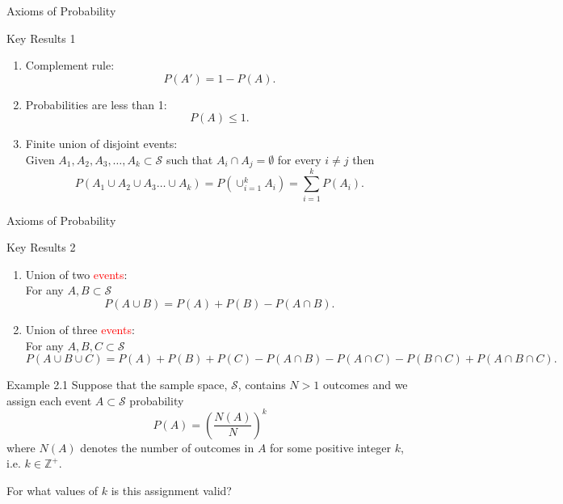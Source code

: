 \documentclass[aspectratio=169,xcolor=pdftex,dvipsnames,table]{beamer}\usepackage[]{graphicx}\usepackage[]{xcolor}
\begin{document}
\begin{frame}{Axioms of Probability}
  \begin{block}{Key Results 1}
    \begin{enumerate}
    \item Complement rule:
      \[
        P(A')=1-P(A).
      \]
    \item Probabilities are less than 1:
      \[P(A) \leq 1.\]
    \item Finite union of disjoint events:\\
      Given $A_1,A_2,A_3,\ldots,A_k \subset \mathcal{S}$ such that $A_i\cap A_j=\emptyset$ for every $i\neq j$ then
      \[
        P(A_1 \cup A_2 \cup A_3\ldots\cup A_k)=P(\cup_{i=1}^k A_i)=\sum_{i=1}^k P(A_i).
      \]
    \end{enumerate}
  \end{block}

\end{frame}

\begin{frame}{Axioms of Probability}
  \begin{block}{Key Results 2}
    \begin{enumerate}
     \item Union of two \textcolor{red}{events}:\\
      For any $A,B \subset \mathcal S$
      \[
        P(A \cup B)=P(A) + P(B) - P(A\cap B).
      \]
    \item Union of three \textcolor{red}{events}:\\
      For any $A,B,C \subset \mathcal S$
      \[
        P(A \cup B\cup C)=P(A) + P(B) +P(C) - P(A\cap B) -P(A\cap C) -P(B \cap C) + P(A \cap B \cap C).
      \]
      
    \end{enumerate}
  \end{block}

\end{frame}

\begin{frame}{Example 2.1}
  Suppose that the sample space, $\mathcal S$, contains $N>1$ outcomes and we assign each event $A \subset \mathcal S$ probability
  \[
    P(A)=\left(\frac{N(A)}{N}\right)^k
  \]
  where $N(A)$ denotes the number of outcomes in $A$ for some positive integer $k$, i.e. $k \in \mathbb{Z}^+$.

  \medskip

  \begin{center}
    For what values of $k$ is this assignment valid?
  \end{center}
  
\end{frame}
\end{document}
